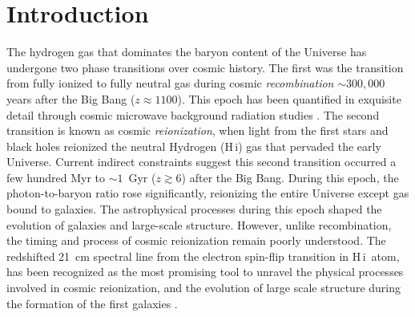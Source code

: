 \documentclass[
reprint,
superscriptaddress,
amsmath,
amssymb,
aps,
prd
]{revtex4-1}
\newcommand{\HI}{H\,{\sc i}}
\begin{document}
\pacs{}%


\maketitle


\section{Introduction}\label{sec:intro}

The hydrogen gas that dominates the baryon content of the Universe has undergone two phase transitions over cosmic history. The first was the transition from fully ionized to fully neutral gas during cosmic \emph{recombination\/} $\sim 300,000$ years after the Big Bang ($z\approx 1100$). This epoch has been quantified in exquisite detail through cosmic microwave background radiation studies \cite{planck15i}. The second transition is known as cosmic \emph{reionization}, when light from the first stars and black holes reionized the neutral Hydrogen (\HI) gas that pervaded the early Universe. Current indirect constraints suggest this second transition occurred a few hundred Myr to $\sim 1$~Gyr ($z\gtrsim 6$) \cite{gre17a} after the Big Bang. During this epoch, the photon-to-baryon ratio rose significantly, reionizing the entire Universe except gas bound to galaxies. The astrophysical processes during this epoch shaped the evolution of galaxies and large-scale structure. However, unlike recombination, the timing and process of cosmic reionization remain poorly understood. The redshifted 21~cm spectral line from the electron spin-flip transition in \HI\ atom, has been recognized as the most promising tool to unravel the physical processes involved in cosmic reionization, and the evolution of large scale structure during the formation of the first galaxies \cite{sun72,sco90,mad97,toz00,ili02,fan02,fan06,bar07,mor10}.
\end{document}
